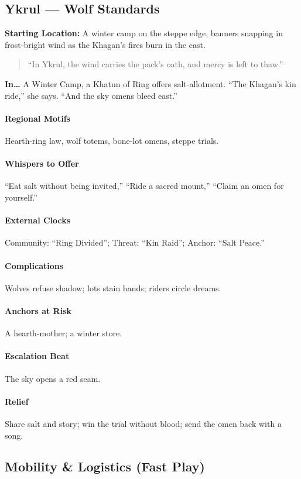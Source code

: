 \subsection*{Ykrul — Wolf Standards}
\textbf{Starting Location:} A winter camp on the steppe edge, banners snapping in frost‑bright wind as the Khagan’s fires burn in the east.
\begin{quote}
“In Ykrul, the wind carries the pack’s oath, and mercy is left to thaw.”
\end{quote}

\textbf{In…} A Winter Camp, a Khatun of Ring offers salt-allotment. ``The Khagan’s kin ride,'' she says. ``And the sky omens bleed east.''
\paragraph{Regional Motifs} Hearth-ring law, wolf totems, bone-lot omens, steppe trials.
\paragraph{Whispers to Offer} ``Eat salt without being invited,'' ``Ride a sacred mount,'' ``Claim an omen for yourself.''
\paragraph{External Clocks} Community: ``Ring Divided''; Threat: ``Kin Raid''; Anchor: ``Salt Peace.''
\paragraph{Complications} Wolves refuse shadow; lots stain hands; riders circle dreams.
\paragraph{Anchors at Risk} A hearth-mother; a winter store.
\paragraph{Escalation Beat} The sky opens a red seam.
\paragraph{Relief} Share salt and story; win the trial without blood; send the omen back with a song.

\subsection*{Mobility \& Logistics (Fast Play)}

